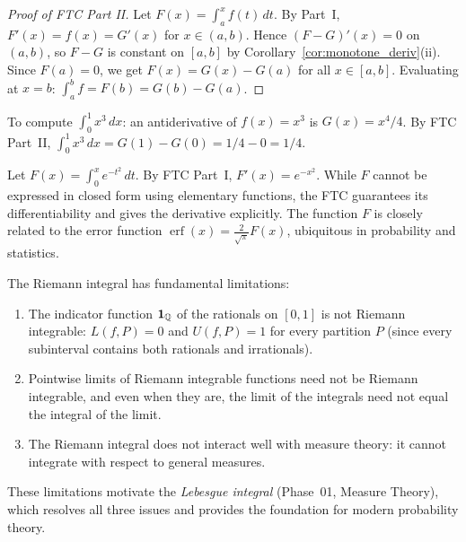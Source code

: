 \documentclass[11pt,a4paper]{article}
\begin{document}
\begin{proof}[Proof of FTC Part II]
Let $F(x) = \int_a^x f(t)\,dt$. By Part~I, $F'(x) = f(x) = G'(x)$ for
$x \in (a, b)$. Hence $(F - G)'(x) = 0$ on $(a, b)$, so $F - G$ is
constant on $[a, b]$ by Corollary~\ref{cor:monotone_deriv}(ii). Since
$F(a) = 0$, we get $F(x) = G(x) - G(a)$ for all $x \in [a, b]$.
Evaluating at $x = b$:
$\int_a^b f = F(b) = G(b) - G(a)$.
\end{proof}

\begin{example}
\label{ex:ftc}
To compute $\int_0^1 x^3\,dx$: an antiderivative of $f(x) = x^3$ is
$G(x) = x^4/4$. By FTC Part~II,
$\int_0^1 x^3\,dx = G(1) - G(0) = 1/4 - 0 = 1/4$.
\end{example}

\begin{example}
\label{ex:ftc_derivative}
Let $F(x) = \int_0^x e^{-t^2}\,dt$. By FTC Part~I, $F'(x) = e^{-x^2}$.
While $F$ cannot be expressed in closed form using elementary functions,
the FTC guarantees its differentiability and gives the derivative
explicitly. The function $F$ is closely related to the error function
$\operatorname{erf}(x) = \frac{2}{\sqrt{\pi}} F(x)$, ubiquitous in
probability and statistics.
\end{example}

\begin{warning}[title={Limitations of the Riemann integral}]
The Riemann integral has fundamental limitations:
\begin{enumerate}[nosep,label=(\roman*)]
  \item The indicator function $\mathbf{1}_{\mathbb{Q}}$ of the rationals on $[0,1]$
    is not Riemann integrable: $L(f, P) = 0$ and $U(f, P) = 1$ for every
    partition $P$ (since every subinterval contains both rationals and
    irrationals).
  \item Pointwise limits of Riemann integrable functions need not be
    Riemann integrable, and even when they are, the limit of the
    integrals need not equal the integral of the limit.
  \item The Riemann integral does not interact well with measure theory:
    it cannot integrate with respect to general measures.
\end{enumerate}
These limitations motivate the \emph{Lebesgue integral} (Phase~01,
Measure Theory), which resolves all three issues and provides the
foundation for modern probability theory.
\end{warning}
\end{document}
